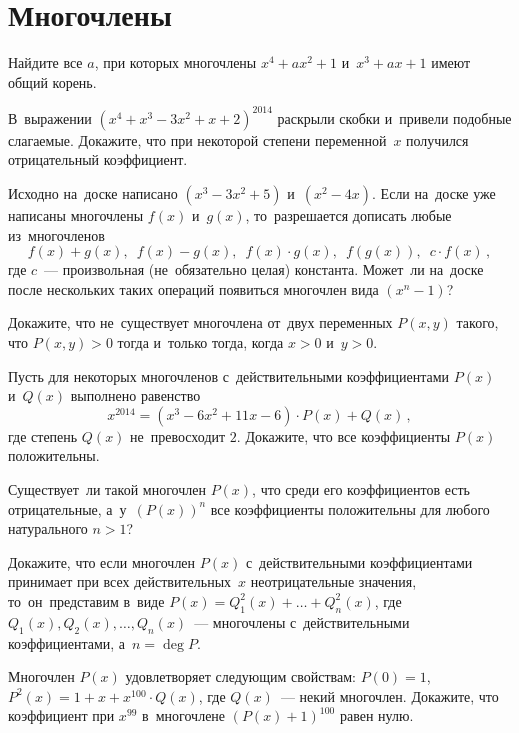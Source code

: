 
\section*{Многочлены}


\begin{problems}

\item
Найдите все $a$, при которых многочлены $x^4 + a x^2 + 1$ и~$x^3 + a x + 1$
имеют общий корень.

\item
В~выражении $(x^4 + x^3 - 3 x^2 + x + 2)^{2014}$ раскрыли скобки и~привели
подобные слагаемые.
Докажите, что при некоторой степени переменной~$x$ получился отрицательный
коэффициент.

\item
Исходно на~доске написано $(x^3 - 3 x^2 + 5)$ и~$(x^2 - 4 x)$.
Если на~доске уже написаны многочлены $f(x)$ и~$g(x)$, то~разрешается дописать
любые из~многочленов
\[
    f(x) + g(x)
,\enspace
    f(x) - g(x)
,\enspace
    f(x) \cdot g(x)
,\enspace
    f(g(x))
,\enspace
    c \cdot f(x)
\,,\]
где $c$~--- произвольная (не~обязательно целая) константа.
Может~ли на~доске после нескольких таких операций появиться многочлен вида
$(x^n - 1)$? 

\item
Докажите, что не~существует многочлена от~двух переменных $P(x, y)$ такого, что
$P(x, y) > 0$ тогда и~только тогда, когда $x > 0$ и~$y > 0$.

\item
Пусть для некоторых многочленов с~действительными коэффициентами
$P(x)$ и~$Q(x)$ выполнено равенство
\[
    x^{2014}
=
    (x^3 - 6 x^2 + 11 x - 6) \cdot P(x) + Q(x)
\,,\]
где степень $Q(x)$ не~превосходит $2$.
Докажите, что все коэффициенты $P(x)$ положительны.

\item
Существует~ли такой многочлен $P(x)$, что среди его коэффициентов есть
отрицательные, а~у~$(P(x))^n$ все коэффициенты положительны для любого
натурального $n > 1$?

\item
Докажите, что если многочлен $P(x)$ с~действительными коэффициентами принимает
при всех действительных~$x$ неотрицательные значения, то~он~представим в~виде
$P(x) = Q_1^2(x) + \ldots + Q_n^2(x)$, где $Q_1(x), Q_2(x), \ldots, Q_n(x)$~---
многочлены с~действительными коэффициентами, а~$n = \deg P$.

\item
Многочлен $P(x)$ удовлетворяет следующим свойствам:
$P(0) = 1$, $P^2(x) = 1 + x + x^{100} \cdot Q(x)$, где $Q(x)$~--- некий
многочлен.
Докажите, что коэффициент при $x^{99}$ в~многочлене $(P(x) + 1)^{100}$ равен
нулю.

\end{problems}

